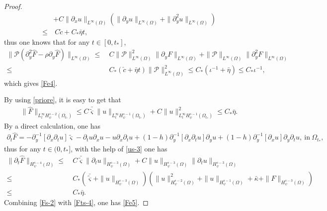 \documentclass{amsart}
\numberwithin{equation}{section}
\begin{document}
\begin{proof}
\begin{align*}
    &+C\|\partial_{x}u\|_{L^{\infty}(\Omega)}\left(\|\partial_{y}u\|_{L^{\infty}(\Omega)}+\|\partial_{y}^{2}u\|_{L^{\infty}(\Omega)}\right)\\
\leq&~C\check{c}+C_{*}\bar{\eta}t,
\end{align*}
thus one knows that for any $t\in[0,t_{*}]$,
\begin{align*}
\|\mathcal{P}(\partial_{y}^{2}\hat{F}-\rho\partial_{y}\hat{F})\|_{L^{\infty}(\Omega)}
\leq&~C\|\mathcal{P}\|_{L^{\infty}(\Omega)}^{2}\|\partial_{y}F\|_{L^{\infty}(\Omega)}
     +\|\mathcal{P}\|_{L^{\infty}(\Omega)}\|\partial_{y}^{2}F\|_{L^{\infty}(\Omega)}\\
\leq&~C_{*}(\check{c}+\bar{\eta}t)\|\mathcal{P}\|_{L^{\infty}(\Omega)}^{2}
\leq C_{*}(\iota^{-1}+\bar{\eta})
\leq C_{*}\iota^{-1},
\end{align*}
which gives \eqref{Fe4}.

By using \eqref{priore}, it is easy to get that
\begin{align}\label{Fs-2}
\|\hat{F}\|_{L_{t}^{\infty}H_{\psi}^{s-2}(\Omega_{t_{*}})}
\leq C\bar{\tilde{\varsigma}}\|u\|_{L_{t}^{\infty}H_{\psi}^{s-1}(\Omega_{t_{*}})}
     +C\|u\|_{L_{t}^{\infty}H_{\psi}^{s-1}(\Omega_{t_{*}})}^{2}
\leq C_{*}\bar{\eta}.
\end{align}
By a direct calculation, one has
\begin{align*}
\partial_{t}\hat{F}
=-\partial_{y}^{-1}[\partial_{x}\partial_{t}u]\tilde{\varsigma}
 -\partial_{t}u\partial_{x}u
 -u\partial_{x}\partial_{t}u
 +(1-h)\partial_{y}^{-1}[\partial_{x}\partial_{t}u]\partial_{y}u
 +(1-h)\partial_{y}^{-1}[\partial_{x}u]\partial_{y}\partial_{t}u,~\text{in}~\Omega_{t_{*}},
\end{align*}
thus for any $t\in(0,t_{*}]$, with the help of \eqref{us-3} one has
\begin{align}\label{Fts-4}
\|\partial_{t}\hat{F}\|_{H_{\psi}^{s-4}(\Omega)}
\leq&~C\bar{\tilde{\varsigma}}\|\partial_{t}u\|_{H_{\psi}^{s-3}(\Omega)}
     +C\|u\|_{H_{\psi}^{s-3}(\Omega)}\|\partial_{t}u\|_{H_{\psi}^{s-3}(\Omega)}\\
\leq&~C_{*}\left(\bar{\tilde{\varsigma}}+\|u\|_{H_{\psi}^{s-3}(\Omega)}\right)
           \left(\|u\|_{H_{\psi}^{s-2}(\Omega)}^{2}+\|u\|_{H_{\psi}^{s-1}(\Omega)}+\bar{\kappa}+\|F\|_{H_{\psi}^{s-3}(\Omega)}\right)\nonumber\\
\leq&~C_{*}\bar{\eta}.\nonumber
\end{align}
Combining \eqref{Fs-2} with \eqref{Fts-4}, one has \eqref{Fe5}.


\end{proof}
\end{document}
